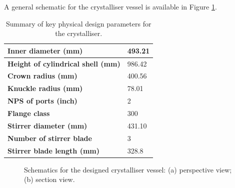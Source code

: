 A general schematic for the crystalliser vessel is available in Figure \ref{fig:crystalliser schematic}. 

\begin{table}[h] \label{tab:crystalliser mech design summary}
\centering
\caption{Summary of key physical design parameters for the crystalliser.}
\begin{tabular}{@{}l|l@{}}
\toprule
\textbf{Inner diameter (mm)}                &    493.21 \\ \midrule
\textbf{Height of cylindrical shell (mm)}   & 986.42 \\ \midrule
\textbf{Crown radius (mm)}                  & 400.56 \\ \midrule
\textbf{Knuckle radius (mm)}                & 78.01 \\ \midrule
\textbf{NPS of ports (inch)}                & 2 \\ \midrule
\textbf{Flange class}                       & 300 \\ \midrule
\textbf{Stirrer diameter (mm)}              & 431.10 \\ \midrule
\textbf{Number of stirrer blade}            & 3 \\ \midrule
\textbf{Stirrer blade length (mm)}          & 328.8 \\ \bottomrule
\end{tabular}
\end{table}

\begin{figure}[h]
    \centering
    
    \caption{Schematics for the designed crystalliser vessel: (a) perspective view; (b) section view.}
    \label{fig:crystalliser schematic}
\end{figure}

